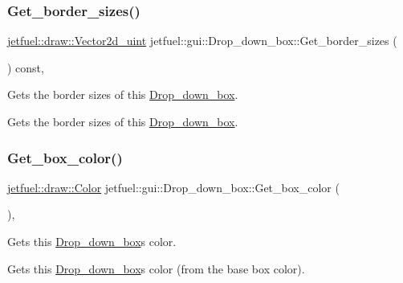 \subsubsection{\texorpdfstring{Get\+\_\+border\+\_\+sizes()}{Get\_border\_sizes()}}
{\footnotesize\ttfamily \hyperlink{classjetfuel_1_1draw_1_1Vector2d}{jetfuel\+::draw\+::\+Vector2d\+\_\+uint} jetfuel\+::gui\+::\+Drop\+\_\+down\+\_\+box\+::\+Get\+\_\+border\+\_\+sizes (\begin{DoxyParamCaption}{ }\end{DoxyParamCaption}) const\hspace{0.3cm}{\ttfamily [inline]}, {\ttfamily [protected]}}



Gets the border sizes of this \hyperlink{classjetfuel_1_1gui_1_1Drop__down__box}{Drop\+\_\+down\+\_\+box}. 

Gets the border sizes of this \hyperlink{classjetfuel_1_1gui_1_1Drop__down__box}{Drop\+\_\+down\+\_\+box}. \mbox{\label{classjetfuel_1_1gui_1_1Drop__down__box_a2635b1bb1d02c27bafbb91c03d312d91}} 
\subsubsection{\texorpdfstring{Get\+\_\+box\+\_\+color()}{Get\_box\_color()}}
{\footnotesize\ttfamily \hyperlink{classjetfuel_1_1draw_1_1Color}{jetfuel\+::draw\+::\+Color} jetfuel\+::gui\+::\+Drop\+\_\+down\+\_\+box\+::\+Get\+\_\+box\+\_\+color (\begin{DoxyParamCaption}{ }\end{DoxyParamCaption})\hspace{0.3cm}{\ttfamily [inline]}, {\ttfamily [protected]}}



Gets this \hyperlink{classjetfuel_1_1gui_1_1Drop__down__box}{Drop\+\_\+down\+\_\+box}\textquotesingle{}s color. 

Gets this \hyperlink{classjetfuel_1_1gui_1_1Drop__down__box}{Drop\+\_\+down\+\_\+box}\textquotesingle{}s color (from the base box color). \mbox{\label{classjetfuel_1_1gui_1_1Drop__down__box_a8f8bd91ea279110cab98b78854207ae7}} 
